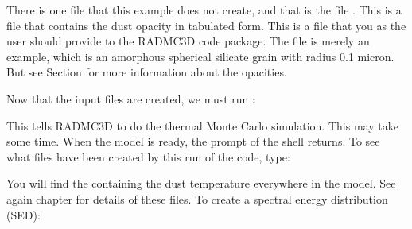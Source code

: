 \documentclass[letterpaper,10pt,english]{sphinxmanual}
\begin{document}
\begin{sphinxVerbatim}[commandchars=\\\{\}]
  
\end{sphinxVerbatim}

There is one file that this example does not create, and that is the file
. This is a file that contains the dust opacity in
tabulated form. This is a file that you as the user should provide to the
RADMC\sphinxhyphen{}3D code package. The file  is merely an example,
which is an amorphous spherical silicate grain with radius 0.1 micron. But see
Section {\hyperref[\detokenize{inputoutputfiles:sec-opacities}]{}} for more information about the opacities.

Now that the input files are created, we must run :

\begin{sphinxVerbatim}[commandchars=\\\{\}]
 
\end{sphinxVerbatim}

This tells RADMC\sphinxhyphen{}3D to do the thermal Monte Carlo simulation. This may
take some time. When the model is ready, the prompt of the shell returns.
To see what files have been created by this run of the code, type:

\begin{sphinxVerbatim}[commandchars=\\\{\}]
  
\end{sphinxVerbatim}

You will find the  containing the dust temperature
everywhere in the model. See again chapter {\hyperref[\detokenize{inputoutputfiles:chap-input-files}]{}} for
details of these files. To create a spectral energy distribution (SED):

\begin{sphinxVerbatim}[commandchars=\\\{\}]
   
\end{sphinxVerbatim}
\end{document}
